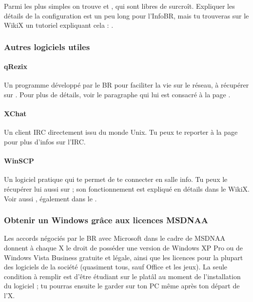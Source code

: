 Parmi les plus simples on trouve  et , qui sont libres de surcro\^{i}t. Expliquer les détails de la configuration est un peu long pour l'InfoBR, mais tu trouveras sur le WikiX un tutoriel expliquant cela : .

\subsubsection{Autres logiciels utiles}

  \paragraph{qRezix} Un programme développé par le BR pour faciliter la vie sur le réseau,
                  à récupérer sur \xshare. Pour plus de détails, voir le paragraphe qui lui est consacré
                  à la page \pageref{qrezix}.
                  
  \paragraph{XChat}  Un client IRC directement issu du monde Unix.
                 Tu peux te reporter à la page \pageref{irc} pour plus d'infos sur l'IRC.
                 
  \paragraph{WinSCP} Un logiciel pratique qui te permet de te connecter en salle info.
                  Tu peux le récupérer lui aussi sur \xshare ;
                  son fonctionnement est expliqué en détails dans le WikiX. Voir aussi , également dans le \xshare.


\subsubsection{Obtenir un Windows grâce aux licences MSDNAA}

\label{msdnaa} Les accords négociés par le BR avec Microsoft dans le cadre de MSDNAA donnent à chaque X le droit de posséder une version de Windows
XP Pro ou de Windows Vista Business gratuite et légale, ainsi que les licences pour la plupart des logiciels de la société (quasiment tous, sauf
Office et les jeux). La seule condition à remplir est d'être étudiant sur le platâl au moment de l'installation du logiciel ; tu pourras ensuite le
garder sur ton PC même après ton départ de l'X.

